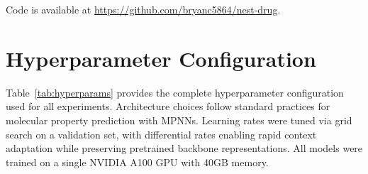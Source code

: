 \documentclass[sigconf]{acmart}
\begin{document}
Code is available at \url{https://github.com/bryanc5864/nest-drug}.




\appendix

\section{Hyperparameter Configuration}
\label{app:hyperparams}

Table~\ref{tab:hyperparams} provides the complete hyperparameter configuration used for all experiments. Architecture choices follow standard practices for molecular property prediction with MPNNs. Learning rates were tuned via grid search on a validation set, with differential rates enabling rapid context adaptation while preserving pretrained backbone representations. All models were trained on a single NVIDIA A100 GPU with 40GB memory.
\end{document}
